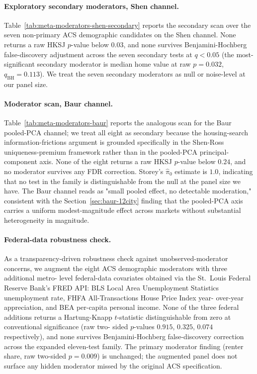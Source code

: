 \paragraph{Exploratory secondary moderators, Shen channel.}
Table~\ref{tab:meta-moderators-shen-secondary} reports the secondary
scan over the seven non-primary ACS demographic candidates on the
Shen channel.  None returns a raw HKSJ $p$-value below $0.03$, and
none survives Benjamini-Hochberg false-discovery adjustment across
the seven secondary tests at $q < 0.05$ (the most-significant
secondary moderator is median home value at raw $p = 0.032$,
$q_{\mathrm{BH}} = 0.113$).  We treat the seven secondary
moderators as null or noise-level at our panel size.

\paragraph{Moderator scan, Baur channel.}
Table~\ref{tab:meta-moderators-baur} reports the analogous scan for
the Baur pooled-PCA channel; we treat all eight as secondary because
the housing-search information-frictions argument is grounded
specifically in the Shen-Ross uniqueness-premium framework rather
than in the pooled-PCA principal-component axis.  None of the eight
returns a raw HKSJ $p$-value below $0.24$, and no moderator survives
any FDR correction.  Storey's $\hat\pi_0$ estimate is $1.0$,
indicating that no test in the family is distinguishable from the
null at the panel size we have.  The Baur channel reads as "small
pooled effect, no detectable moderation," consistent with the
Section~\ref{sec:baur-12city} finding that the pooled-PCA axis
carries a uniform modest-magnitude effect across markets without
substantial heterogeneity in magnitude.

\paragraph{Federal-data robustness check.} As a transparency-driven
robustness check against unobserved-moderator concerns, we augment
the eight ACS demographic moderators with three additional metro-
level federal-data covariates obtained via the St.~Louis Federal
Reserve Bank's FRED API: BLS Local Area Unemployment Statistics
unemployment rate, FHFA All-Transactions House Price Index year-
over-year appreciation, and BEA per-capita personal income.  None
of the three federal additions returns a Hartung-Knapp $t$-statistic
distinguishable from zero at conventional significance (raw two-
sided $p$-values $0.915$, $0.325$, $0.074$ respectively), and none
survives Benjamini-Hochberg false-discovery correction across the
expanded eleven-test family.  The primary moderator finding (renter
share, raw two-sided $p = 0.009$) is unchanged; the augmented panel
does not surface any hidden moderator missed by the original ACS
specification.

